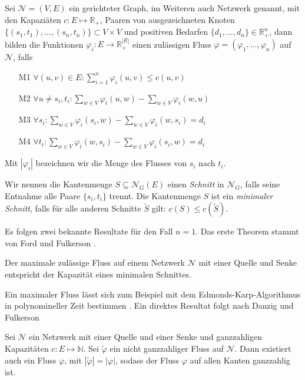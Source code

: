 \begin{definition}\label{def_multi_flow}
Sei $\mathcal{N}=(V,E)$ ein gerichteter Graph, im Weiteren auch Netzwerk genannt, mit den Kapaziäten $c:E\mapsto\mathbb{R}_{+}$, Paaren von ausgezeichneten Knoten $\{(s_1,t_1), ... ,(s_n,t_n)\}\subset V \times V$ und positiven Bedarfen $\{d_1, ... ,d_n\} \in \mathbb{R}_+^n$, dann bilden die Funktionen $\varphi_i: E \to \mathbb{R}_+^{|E|}$ einen zulässigen Fluss $\varphi=(\varphi_1, ... ,\varphi_n)$ auf $\mathcal{N}$, falls
\begin{itemize}
\item[M1] $\forall (u,v) \in E : \sum_{i=1}^{n}{\varphi_i(u,v)} \leq c(u,v) $
\item[M2] $ \forall u \neq s_i,t_i : \sum_{w \in V} \varphi_i(u,w) - \sum_{w \in V} \varphi_i(w,u) $
\item[M3] $ \forall s_i : \sum_{w \in V} \varphi_i(s_i,w) - \sum_{w \in V} \varphi_i(w,s_i) = d_i $
\item[M4] $ \forall t_i : \sum_{w \in V} \varphi_i(w,s_i) - \sum_{w \in V} \varphi_i(s_i,w) = d_i $
\end{itemize}
Mit $|\varphi_i|$ bezeichnen wir die Menge des Flusses von $s_i$ nach $t_i$.
\end{definition}

\begin{definition}
Wir nennen die Kantenmenge $S \subseteq \mathcal{N}_G(E)$ einen \textit{Schnitt} in $\mathcal{N}_G$, falls seine Entnahme alle Paare $\{s_i,t_i\}$ trennt. Die Kantenmenge $S$ ist ein \textit{minimaler Schnitt}, falls für alle anderen Schnitte $\tilde{S}$ gilt: $c(S) \leq c(\tilde{S})$.
\end{definition}

Es folgen zwei bekannte Resultate für den Fall $n=1$. Das erste Theorem stammt von Ford und Fulkerson \cite{ff09}.

\begin{theorem}
Der maximale zulässige Fluss auf einem Netzwerk $\mathcal{N}$ mit einer Quelle und Senke entspricht der Kapazität eines minimalen Schnittes.
\end{theorem}

Ein maximaler Fluss lässt sich zum Beispiel mit dem Edmonds-Karp-Algorithmus in polynomineller Zeit bestimmen \cite[Theorem 8.15]{korte12}. Ein direktes Resultat folgt nach Danzig und Fulkerson \cite{ff09}

\begin{theorem}\label{theo_int_flow}
Sei $\mathcal{N}$ ein Netzwerk mit einer Quelle und einer Senke und ganzzahligen Kapazitäten $c:E\mapsto\mathbb{N}$. Sei $\tilde{\varphi}$ ein nicht ganzzahliger Fluss auf $\mathcal{N}$. Dann existiert auch ein Fluss $\varphi$, mit $|\tilde{\varphi}| = |\varphi|$, sodass der Fluss $\varphi$ auf allen Kanten ganzzahlig ist.
\end{theorem}

